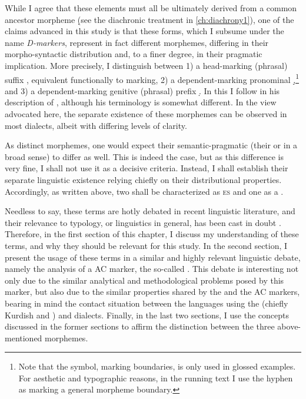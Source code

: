 While I agree that these elements must all be ultimately derived from a common ancestor morpheme \d (see the diachronic treatment in \cref{ch:diachrony1}), one of the claims advanced in this study is that these forms, which I subsume under the name \emph{D-markers}, represent in fact  different morphemes, differing in their morpho-syntactic distribution and, to a finer degree, in their pragmatic implication. More precisely, I distinguish between 1) a head-marking (phrasal) suffix \ed, equivalent functionally to \cst* marking, 2) a dependent-marking pronominal  \d,\footnote{Note that the \cb symbol, marking  boundaries, is only used in glossed examples. For aesthetic and typographic reasons, in the running text I use the hyphen as marking a general morpheme boundary.} and 3) a dependent-marking genitive (phrasal) prefix  \d. In this I follow \citet{CohenNucleus, CohenZakho} in his description of \JZax, although his terminology is somewhat different. In the view advocated here, the separate existence of these morphemes can be observed in most  dialects, albeit with differing levels of clarity. 

As distinct morphemes, one would expect their semantic-pragmatic (their  or  in a broad sense) to differ as well. This is indeed the case, but as this difference is very fine, I shall not use it as a decisive criteria. Instead, I shall establish their separate linguistic existence relying chiefly on their distributional properties. Accordingly, as written above, two shall be characterized as \textsc{es} and one as a .

Needless to say, these terms are hotly debated in recent linguistic literature, and their relevance to typology, or linguistics in general, has been cast in doubt \citep[cf.\ most recently][]{HaspelmathClitics}. Therefore, in the first section of this chapter, I discuss my understanding of these terms, and why they should be relevant for this study. In the second section, I present the usage of these terms in a similar and highly relevant linguistic debate, namely the analysis of a  AC marker, the so-called \ez*. This debate is interesting not only due to the similar analytical and methodological problems posed by this marker, but also due to the similar properties shared by the \ez* and the  AC markers, bearing in mind the contact situation between the  languages using the \ez* (chiefly Kurdish and ) and  dialects. Finally, in the last two sections, I use the concepts discussed in the former sections to affirm the distinction between the three above-mentioned  morphemes.


